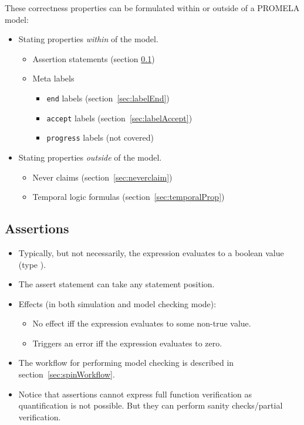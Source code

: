 		These correctness properties can be formulated within or outside of a PROMELA model:
		\begin{itemize}
			\item Stating properties \textit{within} of the model.
				\begin{itemize}
					\item Assertion statements (section \ref{sec:assert})
					\item Meta labels
						\begin{itemize}
							\item \texttt{end} labels (section~\ref{sec:labelEnd})
							\item \texttt{accept} labels (section~\ref{sec:labelAccept})
							\item \texttt{progress} labels (not covered) %
						\end{itemize}
				\end{itemize}
			\item Stating properties \textit{outside} of the model.
				\begin{itemize}
					\item Never claims (section~\ref{sec:neverclaim})
					\item Temporal logic formulas (section~\ref{sec:temporalProp})
				\end{itemize}
		\end{itemize}

		\subsection{Assertions}
			\label{sec:assert}


			\begin{itemize}
				\item Typically, but not necessarily, the expression evaluates to a boolean value (type ).
				\item The assert statement can take any statement position.
				\item Effects (in both simulation and model checking mode):
					\begin{itemize}
						\item No effect iff the expression evaluates to some non-true value.
						\item Triggers an error iff the expression evaluates to zero.
					\end{itemize}
				\item The workflow for performing model checking is described in section~\ref{sec:spinWorkflow}.
				\item Notice that assertions cannot express full function verification as quantification is not possible. But they can perform sanity checks/partial verification.
			\end{itemize}

